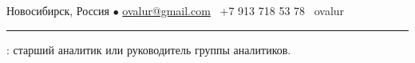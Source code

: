 \documentclass[11pt]{article}
\newif\ifdetailed
\begin{document}
%

\vspace{0.5em}

\noindent Новосибирск, Россия $\bullet$ \href{mailto:ovalur@gmail.com}{ovalur@gmail.com} \faMobile~+7 913 718 53 78 \faSendO~ovalur

\vspace{0.5em}
\hrule
\vspace{1.0em}

\ifdetailed
\noindent {\textbf{Цель}}: работать в стабильной IT-компании старшим аналитиком, руководителем группы аналитиков или менеджером технических проектов. Предпочитаю работать в интернет-проектах или образовании, но открыт для других возможностей и задач.
\else
{}: старший аналитик или руководитель группы аналитиков.
\fi

\vspace{1em}
\end{document}
